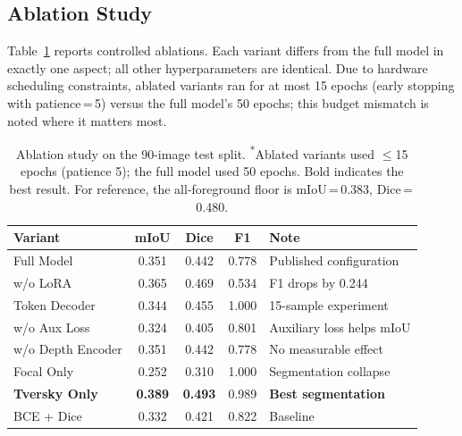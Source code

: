 \documentclass[remotesensing,article,accept,moreauthors,pdftex]{Definitions/mdpi}
\begin{document}
\subsection{Ablation Study}
\label{sec:ablation}

Table~\ref{tab:ablation} reports controlled ablations. Each variant differs from
the full model in exactly one aspect; all other hyperparameters are identical.
Due to hardware scheduling constraints, ablated variants ran for at most 15
epochs (early stopping with patience\,=\,5) versus the full model's 50 epochs;
this budget mismatch is noted where it matters most.

\begin{table}[H]
\centering
\small
\caption{Ablation study on the 90-image test split.
\textsuperscript{*}Ablated variants used $\leq$15 epochs (patience 5);
the full model used 50 epochs. Bold indicates the best result. For reference,
the all-foreground floor is mIoU\,=\,0.383, Dice\,=\,0.480.}
\label{tab:ablation}
\begin{tabular}{lccc p{3.8cm}}
\toprule
\textbf{Variant} & \textbf{mIoU} & \textbf{Dice} & \textbf{F1} & \textbf{Note} \\
\midrule
Full Model
  & 0.351 & 0.442 & 0.778 & Published configuration \\

w/o LoRA
  & 0.365 & 0.469 & 0.534 & F1 drops by 0.244 \\

Token Decoder
  & 0.344 & 0.455 & 1.000 & 15-sample experiment \\

w/o Aux Loss
  & 0.324 & 0.405 & 0.801 & Auxiliary loss helps mIoU \\

w/o Depth Encoder
  & 0.351 & 0.442 & 0.778 & No measurable effect \\

\midrule

Focal Only
  & 0.252 & 0.310 & 1.000 & Segmentation collapse \\

\textbf{Tversky Only}
  & \textbf{0.389} & \textbf{0.493} & 0.989 &
    \textbf{Best segmentation} \\

BCE + Dice
  & 0.332 & 0.421 & 0.822 & Baseline \\

\bottomrule
\end{tabular}
\end{table}
\end{document}
